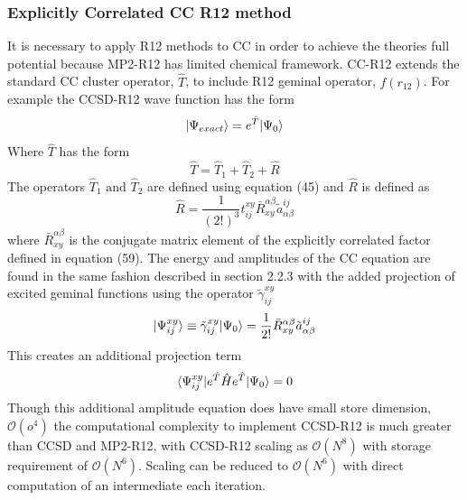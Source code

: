     \subsubsection{Explicitly Correlated CC R12 method}
      It is necessary to apply R12 methods to CC in order to achieve the theories full potential because MP2-R12 has limited chemical framework\cite{kong 2012}.  CC-R12 extends the standard CC cluster operator, $\hat{T}$, to include R12 geminal operator, $f(r_{12})$\cite{Noga 1992, Noga 1994}.  For example the CCSD-R12 wave function has the form 
        \begin{equation}
          | \Psi_{exact} \rangle = e^{\hat{T}}| \Psi_0 \rangle
        \end{equation}
      Where $\hat{T}$ has the form
        \begin{equation}
          \hat{T} = \hat{T}_1 + \hat{T}_2 + \hat{R}
        \end{equation}
      The operators $\hat{T}_1 \text{ and } \hat{T}_2$ are defined using equation (45) and $\hat{R}$ is defined as 
        \begin{equation}
          \hat{R} = \frac{1}{(2!)^3} t^{xy}_{ij} \bar{R}^{\alpha \beta}_{xy} \tilde{a}^{ij}_{\alpha \beta}
        \end{equation}
      where $\bar{R}^{\alpha \beta}_{xy}$ is the conjugate matrix element of the explicitly correlated factor defined in equation (59).
      The energy and amplitudes of the CC equation are found in the same fashion described in section 2.2.3 with the added projection of excited geminal functions using the operator $\tilde{\gamma}^{xy}_{ij}$
        \begin{equation}
          | \Psi^{xy}_{ij} \rangle \equiv \tilde{\gamma}^{xy}_{ij}| \Psi_0 \rangle = \frac{1}{2!} \bar{R}^{\alpha \beta}_{xy} \tilde{a}^{ij}_{\alpha \beta}
        \end{equation}
      This creates an additional projection term
        \begin{equation}
          \langle\Psi^{xy}_{ij} | e^{\hat{T}} \hat{H} e^{\hat{T}} | \Psi_0 \rangle = 0
        \end{equation}
      Though this additional amplitude equation does have small store dimension, $\mathcal{O}(o^4)$ the computational complexity to implement CCSD-R12 is much greater than CCSD and MP2-R12, with CCSD-R12 scaling as $\mathcal{O}(N^8)$ with storage requirement of $\mathcal{O}(N^6)$.  Scaling can be reduced to $\mathcal{O}(N^6)$ with direct computation of an intermediate each iteration.\cite{Kong 2012} 
